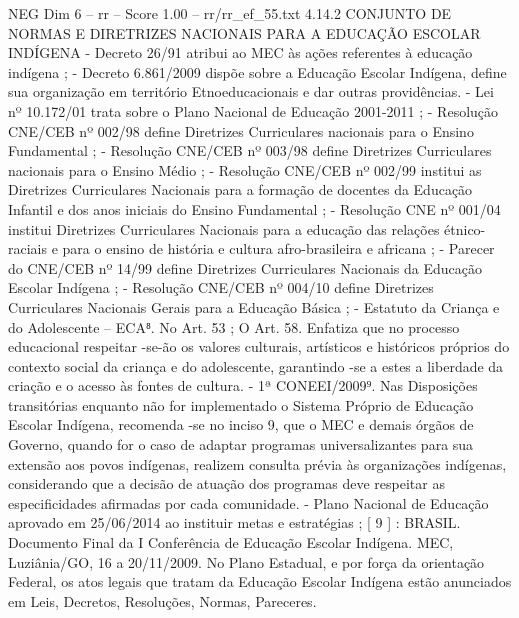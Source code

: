\begin{textsample}{NEG Dim 6 – rr – Score 1.00 – rr/rr\_ef\_55.txt}  \label{ex:f6_neg_076}
4.14.2 CONJUNTO DE NORMAS E DIRETRIZES NACIONAIS PARA A EDUCAÇÃO ESCOLAR INDÍGENA - Decreto 26/91 atribui ao MEC às ações referentes à educação indígena ; - Decreto 6.861/2009 dispõe sobre a Educação Escolar Indígena, define sua organização em território Etnoeducacionais e dar outras providências. - Lei nº 10.172/01 trata sobre o Plano Nacional de Educação 2001-2011 ; - Resolução CNE/CEB nº 002/98 define Diretrizes Curriculares nacionais para o Ensino Fundamental ; - Resolução CNE/CEB nº 003/98 define Diretrizes Curriculares nacionais para o Ensino Médio ; - Resolução CNE/CEB nº 002/99 institui as Diretrizes Curriculares Nacionais para a formação de docentes da Educação Infantil e dos anos iniciais do Ensino Fundamental ; - Resolução CNE nº 001/04 institui Diretrizes Curriculares Nacionais para a educação das relações étnico-raciais e para o ensino de história e cultura afro-brasileira e africana ; - Parecer do CNE/CEB nº 14/99 define Diretrizes Curriculares Nacionais da Educação Escolar Indígena ; - Resolução CNE/CEB nº 004/10 define Diretrizes Curriculares Nacionais Gerais para a Educação Básica ; - Estatuto da Criança e do Adolescente – ECA⁸.
No Art. 53 ; O Art. 58.
Enfatiza que no processo educacional respeitar -se-ão os valores culturais, artísticos e históricos próprios do contexto social da criança e do adolescente, garantindo -se a estes a liberdade da criação e o acesso às fontes de cultura. - 1ª CONEEI/2009⁹.
Nas Disposições transitórias enquanto não for implementado o Sistema Próprio de Educação Escolar Indígena, recomenda -se no inciso 9, que o MEC e demais órgãos de Governo, quando for o caso de adaptar programas universalizantes para sua extensão aos povos indígenas, realizem consulta prévia às organizações indígenas, considerando que a decisão de atuação dos programas deve respeitar as especificidades afirmadas por cada comunidade. - Plano Nacional de Educação aprovado em 25/06/2014 ao instituir metas e estratégias ; [ 9 ] : BRASIL.
Documento Final da I Conferência de Educação Escolar Indígena.
MEC, Luziânia/GO, 16 a 20/11/2009.
No Plano Estadual, e por força da orientação Federal, os atos legais que tratam da Educação Escolar Indígena estão anunciados em Leis, Decretos, Resoluções, Normas, Pareceres.

\end{textsample}
